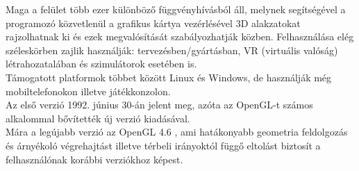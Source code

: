 Maga a felület több ezer különböző függvényhívásból áll, melynek segítségével a programozó közvetlenül a grafikus kártya vezérlésével 3D alakzatokat rajzolhatnak ki és ezek megvalósítását szabályozhatják közben. Felhasználása elég széleskörben zajlik használják: tervezésben/gyártásban, VR (virtuális valóság) létrahozatalában és szimulátorok esetében is.\\

Támogatott platformok többet között Linux és Windows, de használják még mobiltelefonokon illetve játékkonzolon.\\

Az első verzió 1992. június 30-án jelent meg, azóta az OpenGL-t számos alkalommal bővítették új verzió kiadásával.\\

Mára a legújabb verzió az OpenGL 4.6 , ami hatákonyabb geometria feldolgozás és árnyékoló végrehajtást illetve térbeli irányoktól függő eltolást biztosít a felhasználónak korábbi verziókhoz képest.\cite{khronos1997opengl}






